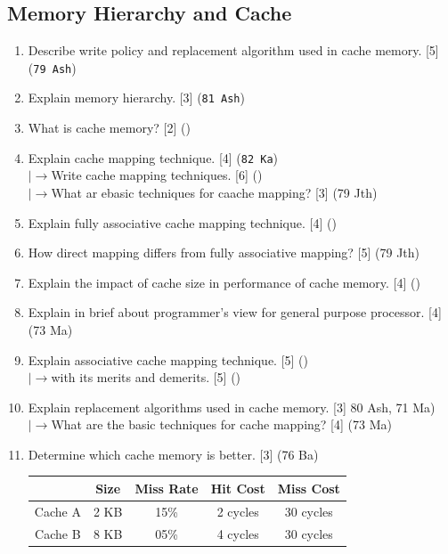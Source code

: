 \documentclass[12pt]{article}
\newcommand{\lb}{\\$\left|\rightarrow\right.$}
\begin{document}
  \subsection{Memory Hierarchy and Cache}
    \begin{enumerate}
      \item Describe write policy and replacement algorithm used in cache memory. \hfill [5] (\texttt{79 Ash})

      \item Explain memory hierarchy. \hfill [3] (\texttt{81 Ash})

      \item What is cache memory? \hfill [2] ()

      \item Explain cache mapping technique. \hfill [4] (\texttt{82 Ka})
        \lb Write cache mapping techniques. \hfill [6] ()
        \lb What ar ebasic techniques for caache mapping? \hfill [3] (79 Jth)

      \item Explain fully associative cache mapping technique. \hfill [4] ()

      \item How direct mapping differs from fully associative mapping? \hfill [5] (79 Jth)

      \item Explain the impact of cache size in performance of cache memory. \hfill [4] ()

      \item Explain in brief about programmer's view for general purpose processor. \hfill [4] (73 Ma)

      \item Explain associative cache mapping technique. \hfill [5] () 
      \lb with its merits and demerits. \hfill [5] ()

      \item Explain replacement algorithms used in cache memory. \hfill [3] {80 Ash}, 71 Ma)
        \lb What are the basic techniques for cache mapping? \hfill [4] (73 Ma)

      \item Determine which cache memory is better. \hfill [3] (76 Ba)
      \begin{tabular}{|c|c|c|c|c|}
        \hline
        & Size & Miss Rate & Hit Cost & Miss Cost \\ \hline
        Cache A & 2 KB & 15\% & 2 cycles & 30 cycles \\ \hline
        Cache B & 8 KB & 05\% & 4 cycles & 30 cycles \\ \hline
      \end{tabular}
    \end{enumerate}
\end{document}
